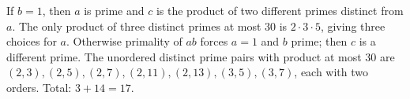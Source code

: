 If $b=1$, then $a$ is prime and $c$ is the product of two different primes distinct from $a$. The only product of three distinct primes at most $30$ is $2\cdot3\cdot5$, giving three choices for $a$. Otherwise primality of $ab$ forces $a=1$ and $b$ prime; then $c$ is a different prime. The unordered distinct prime pairs with product at most $30$ are $(2,3),(2,5),(2,7),(2,11),(2,13),(3,5),(3,7)$, each with two orders. Total: $3+14=\boxed{17}$.
